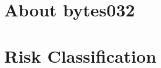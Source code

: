 \hypertarget{about-bytes}{%
\section{About bytes032}\label{about-bytes}}




\hypertarget{risk-classification}{%
\section{Risk Classification}\label{risk-classification}}


